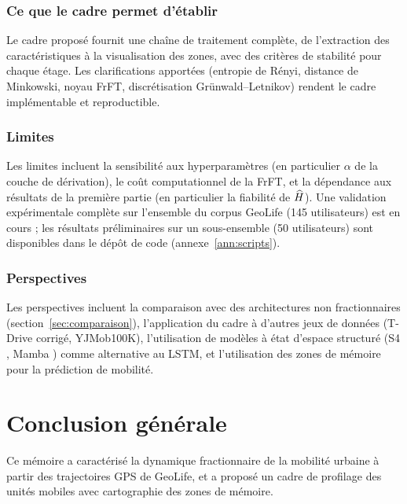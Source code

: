 \subsection{Ce que le cadre permet d'établir}
Le cadre proposé fournit une chaîne de traitement complète, de l'extraction des caractéristiques à la visualisation des zones, avec des critères de stabilité pour chaque étage. Les clarifications apportées (entropie de Rényi, distance de Minkowski, noyau FrFT, discrétisation Grünwald--Letnikov) rendent le cadre implémentable et reproductible.

\subsection{Limites}
Les limites incluent la sensibilité aux hyperparamètres (en particulier $\alpha$ de la couche de dérivation), le coût computationnel de la FrFT, et la dépendance aux résultats de la première partie (en particulier la fiabilité de $\widehat{H}$). Une validation expérimentale complète sur l'ensemble du corpus GeoLife (145 utilisateurs) est en cours ; les résultats préliminaires sur un sous-ensemble (50 utilisateurs) sont disponibles dans le dépôt de code (annexe~\ref{ann:scripts}).

\subsection{Perspectives}
Les perspectives incluent la comparaison avec des architectures non fractionnaires (section~\ref{sec:comparaison}), l'application du cadre à d'autres jeux de données (T-Drive corrigé, YJMob100K), l'utilisation de modèles à état d'espace structuré (S4 \cite{gu2022}, Mamba \cite{gu2023}) comme alternative au LSTM, et l'utilisation des zones de mémoire pour la prédiction de mobilité.

\chapter*{Conclusion générale}

Ce mémoire a caractérisé la dynamique fractionnaire de la mobilité urbaine à partir des trajectoires GPS de GeoLife, et a proposé un cadre de profilage des unités mobiles avec cartographie des zones de mémoire.


